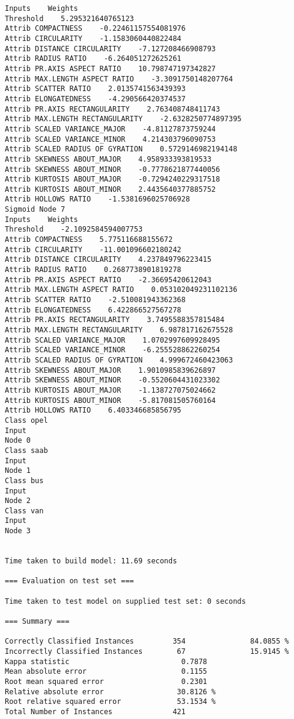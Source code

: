 \documentclass[
	article,			%
	11pt,				%
	oneside,			%
	a4paper,			%
	english,			%
	brazil,				%
	sumario=tradicional
	]{abntex2}
\begin{document}
\begin{lstlisting}
Inputs    Weights
Threshold    5.295321640765123
Attrib COMPACTNESS    -0.22461157554081976
Attrib CIRCULARITY    -1.1583060440822484
Attrib DISTANCE CIRCULARITY    -7.127208466908793
Attrib RADIUS RATIO    -6.264051272625261
Attrib PR.AXIS ASPECT RATIO    10.798747197342827
Attrib MAX.LENGTH ASPECT RATIO    -3.3091750148207764
Attrib SCATTER RATIO    2.0135741563439393
Attrib ELONGATEDNESS    -4.290566420374537
Attrib PR.AXIS RECTANGULARITY    2.763408748411743
Attrib MAX.LENGTH RECTANGULARITY    -2.6328250774897395
Attrib SCALED VARIANCE_MAJOR    -4.81127873759244
Attrib SCALED VARIANCE_MINOR    4.214303796090753
Attrib SCALED RADIUS OF GYRATION    0.5729146982194148
Attrib SKEWNESS ABOUT_MAJOR    4.958933393819533
Attrib SKEWNESS ABOUT_MINOR    -0.7778621877440056
Attrib KURTOSIS ABOUT_MAJOR    -0.7294240229317518
Attrib KURTOSIS ABOUT_MINOR    2.4435640377885752
Attrib HOLLOWS RATIO    -1.5381696025706928
Sigmoid Node 7
Inputs    Weights
Threshold    -2.1092584594007753
Attrib COMPACTNESS    5.775116688155672
Attrib CIRCULARITY    -11.001096602180242
Attrib DISTANCE CIRCULARITY    4.237849796223415
Attrib RADIUS RATIO    0.2687738901819278
Attrib PR.AXIS ASPECT RATIO    -2.36695420612043
Attrib MAX.LENGTH ASPECT RATIO    0.053102049231102136
Attrib SCATTER RATIO    -2.510081943362368
Attrib ELONGATEDNESS    6.422866527567278
Attrib PR.AXIS RECTANGULARITY    3.7495588357815484
Attrib MAX.LENGTH RECTANGULARITY    6.987817162675528
Attrib SCALED VARIANCE_MAJOR    1.0702997609928495
Attrib SCALED VARIANCE_MINOR    -6.255528862260254
Attrib SCALED RADIUS OF GYRATION    4.999672460423063
Attrib SKEWNESS ABOUT_MAJOR    1.9010985839626897
Attrib SKEWNESS ABOUT_MINOR    -0.5520604431023302
Attrib KURTOSIS ABOUT_MAJOR    -1.138727075024662
Attrib KURTOSIS ABOUT_MINOR    -5.817081505760164
Attrib HOLLOWS RATIO    6.403346685856795
Class opel
Input
Node 0
Class saab
Input
Node 1
Class bus
Input
Node 2
Class van
Input
Node 3


Time taken to build model: 11.69 seconds

=== Evaluation on test set ===

Time taken to test model on supplied test set: 0 seconds

=== Summary ===

Correctly Classified Instances         354               84.0855 %
Incorrectly Classified Instances        67               15.9145 %
Kappa statistic                          0.7878
Mean absolute error                      0.1155
Root mean squared error                  0.2301
Relative absolute error                 30.8126 %
Root relative squared error             53.1534 %
Total Number of Instances              421     


\end{lstlisting}
\end{document}

